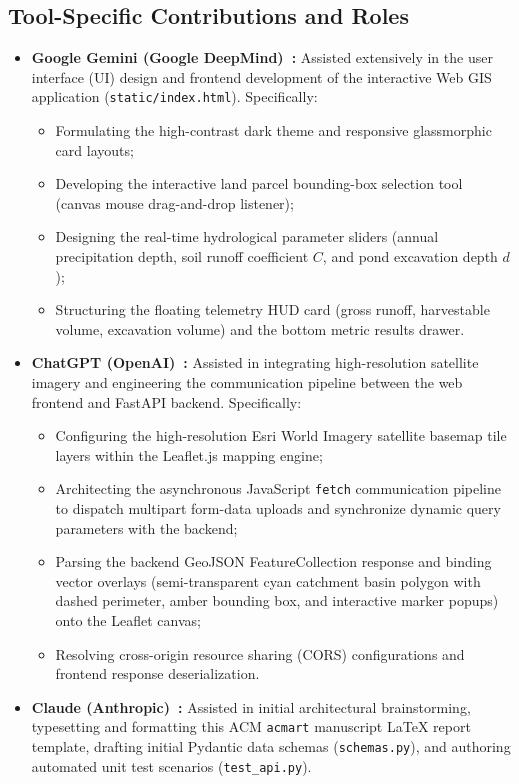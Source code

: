 \documentclass[manuscript,screen,review]{acmart}
\begin{document}
\subsection{Tool-Specific Contributions and Roles}
\begin{itemize}
    \item \textbf{Google Gemini (Google DeepMind)~\cite{gemini2024}:}
    Assisted extensively in the user interface (UI) design and frontend development of the interactive Web GIS application (\texttt{static/index.html}). Specifically:
    \begin{itemize}
        \item Formulating the high-contrast dark theme and responsive glassmorphic card layouts;
        \item Developing the interactive land parcel bounding-box selection tool (canvas mouse drag-and-drop listener);
        \item Designing the real-time hydrological parameter sliders (annual precipitation depth, soil runoff coefficient $C$, and pond excavation depth $d$);
        \item Structuring the floating telemetry HUD card (gross runoff, harvestable volume, excavation volume) and the bottom metric results drawer.
    \end{itemize}

    \item \textbf{ChatGPT (OpenAI)~\cite{chatgpt2024}:}
    Assisted in integrating high-resolution satellite imagery and engineering the communication pipeline between the web frontend and FastAPI backend. Specifically:
    \begin{itemize}
        \item Configuring the high-resolution Esri World Imagery satellite basemap tile layers within the Leaflet.js mapping engine;
        \item Architecting the asynchronous JavaScript \texttt{fetch} communication pipeline to dispatch multipart form-data uploads and synchronize dynamic query parameters with the backend;
        \item Parsing the backend GeoJSON FeatureCollection response and binding vector overlays (semi-transparent cyan catchment basin polygon with dashed perimeter, amber bounding box, and interactive marker popups) onto the Leaflet canvas;
        \item Resolving cross-origin resource sharing (CORS) configurations and frontend response deserialization.
    \end{itemize}

    \item \textbf{Claude (Anthropic)~\cite{claude2024}:}
    Assisted in initial architectural brainstorming, typesetting and formatting this ACM \texttt{acmart} manuscript LaTeX report template, drafting initial Pydantic data schemas (\texttt{schemas.py}), and authoring automated unit test scenarios (\texttt{test\_api.py}).
\end{itemize}
\end{document}
